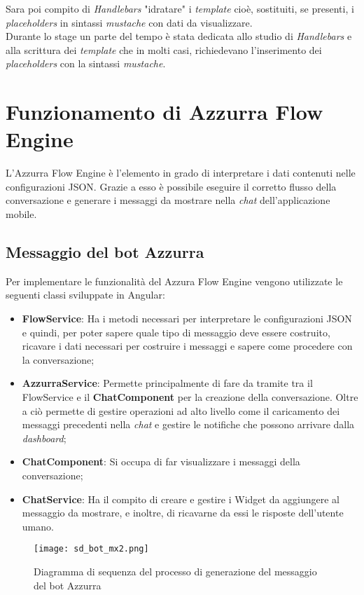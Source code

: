  Sara poi compito di \emph{Handlebars} "idratare" i \emph{template} cioè,  sostituiti, se presenti, i \emph{placeholders} in sintassi \emph{mustache} con dati da visualizzare.\\

 Durante lo stage un parte del tempo è stata dedicata allo studio di \emph{Handlebars} e alla scrittura dei \emph{template} che in molti casi, richiedevano l'inserimento dei \emph{placeholders} con la sintassi \emph{mustache}.
 

\section{Funzionamento di Azzurra Flow Engine}
L'Azzurra Flow Engine è l'elemento in grado di interpretare i dati contenuti nelle configurazioni JSON. Grazie a esso è possibile eseguire il corretto flusso della conversazione e generare i messaggi da mostrare nella \emph{chat} dell'applicazione mobile. 
\subsection{Messaggio del bot Azzurra}
Per implementare le funzionalità del Azzura Flow Engine vengono utilizzate le seguenti classi sviluppate in Angular:
\begin{itemize}
	\item \textbf{FlowService}: Ha i metodi necessari per interpretare le configurazioni JSON e quindi, per poter sapere quale tipo di messaggio deve essere costruito, ricavare i dati necessari per costruire i messaggi e sapere come procedere con la conversazione;
	\item \textbf{AzzurraService}: Permette principalmente di fare da tramite tra il FlowService e il \textbf{ChatComponent} per la creazione della conversazione. Oltre a ciò permette di gestire operazioni ad alto livello come il caricamento dei messaggi precedenti nella \emph{chat} e gestire le notifiche che possono arrivare dalla \emph{dashboard};
	\item \textbf{ChatComponent}: Si occupa di far visualizzare i messaggi della conversazione;
	\item \textbf{ChatService}: Ha il compito di creare e gestire i Widget da aggiungere al messaggio da mostrare, e inoltre, di ricavarne da essi le risposte dell'utente umano.
\end{itemize}

\begin{figure}[htbp]
	\centering
	\texttt{[image: sd\_bot\_mx2.png]}
	\caption{Diagramma di sequenza del processo di generazione del messaggio del bot Azzurra}\label{fig:mxBot}
\end{figure}

